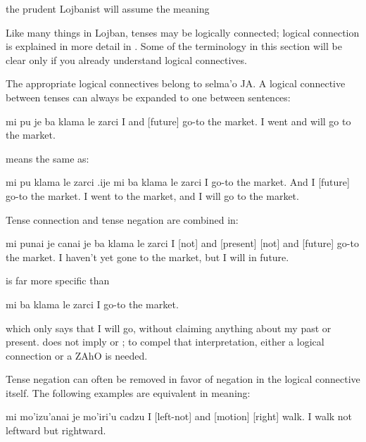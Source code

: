 {\noindent}the prudent Lojbanist will assume the meaning 



Like many things in Lojban, tenses may be logically
    connected; logical connection is explained in more detail in . Some of the terminology in
    this section will be clear only if you already understand
    logical connectives.

The appropriate logical connectives belong to selma'o JA. A
    logical connective between tenses can always be expanded to one
    between sentences:
\begin{example}
mi pu je ba klama le zarci\n
I  and [future] go-to the market.\n
I went and will go to the market.
\end{example}

{\noindent}means the same as:
\begin{example}
mi pu klama le zarci\n
\T	.ije mi ba klama le zarci\n
I  go-to the market.\n
\T	And I [future] go-to the market.\n
I went to the market, and I will go to the market.
\end{example}

Tense connection and tense negation are combined in:
\begin{example}
mi punai je canai je ba\n
\T	klama le zarci\n
I  [not] and [present] [not] and [future]\n
\T	go-to the market.\n
I haven't yet gone to the market, but I will in future.
\end{example}

 is far more specific than
\begin{example}
mi ba klama le zarci\n
I  go-to the market.
\end{example}

{\noindent}which only says that I will go, without claiming anything about
    my past or present.  does not imply  or
    ; to compel that interpretation, either a logical
    connection or a ZAhO is needed. 

Tense negation can often be removed in favor of negation in
    the logical connective itself. The following examples are
    equivalent in meaning:
\begin{example}
mi mo'izu'anai je mo'iri'u cadzu\n
I  [left-not] and [motion] [right] walk.\n
I walk not leftward but rightward.
\end{example}

